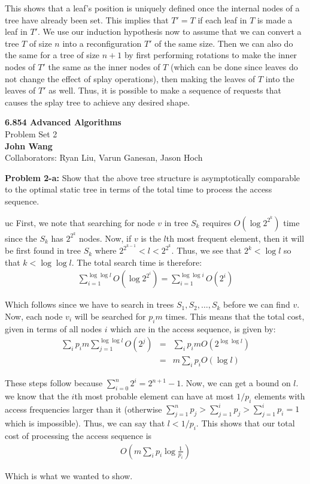 \documentclass[psamsfonts]{amsart}
\newenvironment{sol}{\vspace{0.25cm}{\large \bfseries Solution:}}{\qedsymbol}
\newenvironment{prob}[1]{\begin{framed}{\large \bfseries Problem #1:}}{\end{framed}}
\newcommand{\makenewtitle}{
\begin{center}
{\huge \bfseries 6.854 Advanced Algorithms} \\
Problem Set 2\\
\vspace{0.25cm}
{\bfseries John Wang} \\
Collaborators: Ryan Liu, Varun Ganesan, Jason Hoch
\end{center}
\vspace{0.5cm}
}
\begin{document}
\begin{sol}
This shows that a leaf's position is uniquely defined once the internal nodes of a tree have already been set. This implies that $T' = T$ if each leaf in $T$ is made a leaf in $T'$. We use our induction hypothesis now to assume that we can convert a tree $T$ of size $n$ into a reconfiguration $T'$ of the same size. Then we can also do the same for a tree of size $n+1$ by first performing rotations to make the inner nodes of $T'$ the same as the inner nodes of $T$ (which can be done since leaves do not change the effect of splay operations), then making the leaves of $T$ into the leaves of $T'$ as well. Thus, it is possible to make a sequence of requests that causes the splay tree to achieve any desired shape.
\end{sol}

\newpage

\makenewtitle

\begin{prob}{2-a}
Show that the above tree structure is asymptotically comparable to the optimal static tree in terms of the total time to process the access sequence.
\end{prob}

uc\begin{sol}
First, we note that searching for node $v$ in tree $S_k$ requires $O(\log 2^{2^k})$ time since the $S_k$ has $2^{2^k}$ nodes. Now, if $v$ is the $l$th most frequent element, then it will be first found in tree $S_k$ where $2^{2^{k-1}} < l < 2^{2^{k}}$. Thus, we see that $2^k < \log l$ so that $k < \log \log l$. The total search time is therefore:
\begin{eqnarray}
\sum_{i=1}^{\log \log l} O(\log 2^{2^i}) = \sum_{i=1}^{\log \log i} O(2^i)
\end{eqnarray}

Which follows since we have to search in trees $S_1, S_2, \ldots, S_k$ before we can find $v$. Now, each node $v_i$ will be searched for $p_i m$ times. This means that the total cost, given in terms of all nodes $i$ which are in the access sequence, is given by:
\begin{eqnarray}
\sum_{i} p_i m \sum_{j=1}^{\log \log l} O(2^j) &=& \sum_{i} p_i m O(2^{\log \log l}) \\
&=& m \sum_{i} p_i O(\log l) 
\end{eqnarray}

These steps follow because $\sum_{i=0}^n 2^i = 2^{n+1} - 1$. Now, we can get a bound on $l$. we know that the $i$th most probable element can have at most $1/p_i$ elements with access frequencies larger than it (otherwise $\sum_{j=1}^n p_j > \sum_{j=1}^i p_j > \sum_{j=1}^i p_i = 1$ which is impossible). Thus, we can say that $l < 1/p_i$. This shows that our total cost of processing the access sequence is 
\begin{eqnarray}
O \left( m \sum_{i} p_i \log \frac{1}{p_i} \right)
\end{eqnarray}

Which is what we wanted to show.
\end{sol}
\end{document}
